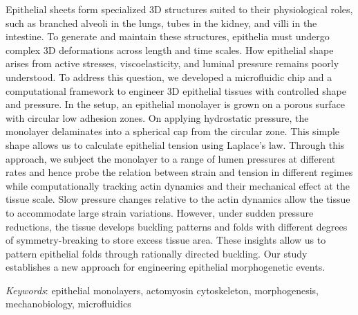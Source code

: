 

\begin{Abstract}
Epithelial sheets form specialized 3D structures suited to their physiological roles, such as branched alveoli in the lungs, tubes in the kidney, and villi in the intestine. To generate and maintain these structures, epithelia must undergo complex 3D deformations across length and time scales. How epithelial shape arises from active stresses, viscoelasticity, and luminal pressure remains poorly understood. To address this question, we developed a microfluidic chip and a computational framework to engineer 3D epithelial tissues with controlled shape and pressure. In the setup, an epithelial monolayer is grown on a porous surface with circular low adhesion zones. On applying hydrostatic pressure, the monolayer delaminates into a spherical cap from the circular zone. This simple shape allows us to calculate epithelial tension using Laplace’s law. Through this approach, we subject the monolayer to a range of lumen pressures at different rates and hence probe the relation between strain and tension in different regimes while computationally tracking actin dynamics and their mechanical effect at the tissue scale. Slow pressure changes relative to the actin dynamics allow the tissue to accommodate large strain variations. However, under sudden pressure reductions, the tissue develops buckling patterns and folds with different degrees of symmetry-breaking to store excess tissue area. These insights allow us to pattern epithelial folds through rationally directed buckling. Our study establishes a new approach for engineering epithelial morphogenetic events.
\end{Abstract}

{\footnotesize
	\emph{Keywords}: epithelial monolayers, actomyosin cytoskeleton, morphogenesis, mechanobiology, microfluidics
}
\vfill 
\cleardoublepage
